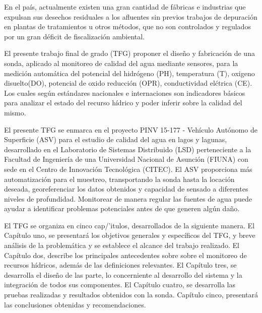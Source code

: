 En el pa\'is, actualmente existen una gran cantidad de f\'abricas e industrias que expulsan sus desechos residuales a los afluentes sin previos trabajos de depuraci\'on en plantas de tratamientos u otros m\'etodos, que no son controlados y regulados por un gran d\'eficit de fiscalizaci\'on ambiental. 


%
%
%

El presente trabajo final de grado (TFG) proponer el dise\~no y fabricación de una sonda, aplicado al monitoreo de calidad del agua mediante sensores, para la medici\'on autom\'atica del potencial del hidr\'ogeno (PH), temperatura (T), oxigeno disuelto(DO), potencial de oxido reducci\'on (OPR), conductividad el\'ctrica (CE). Los cuales seg\'un est\'andares nacionales e internaciones son indicadores b\'asicos para analizar el estado del recurso h\'idrico y poder inferir sobre la calidad del mismo.  


El presente TFG se enmarca en el proyecto PINV 15-177 - Veh\'iculo Aut\'onomo de Superficie (ASV) para el estudio de calidad del agua en lagos y lagunas, desarrollado en el Laboratorio de Sistemas Distribuido (LSD) perteneciente a la Facultad de Ingenier\'ia de una Universidad Nacional de Asunci\'on (FIUNA) con sede en el Centro de Innovaci\'on Tecnol\'ogica (CITEC). El ASV proporciona m\'as automatizaci\'on para el muestreo, transportando la sonda hasta la locaci\'on deseada, georeferenciar los datos obtenidos y capacidad de sensado a diferentes niveles de profundidad. Monitorear de manera regular las fuentes de agua puede ayudar a identificar problemas potenciales antes de que generen algún daño.

El TFG  se organiza en cinco cap/'itulos, desarrollados de la siguiente manera. 
El Capítulo uno, se presentar\'a los objetivos generales y espec\'ificos del TFG,  y breve an\'alisis de la problem\'atica y se establece el alcance del trabajo realizado.
El Capítulo dos, describe los principales antecedentes sobre sobre el monitoreo de recursos h\'idricos, adem\'as de las definiciones relevantes.
El Capítulo tres, se desarrolla el dise\~no de las parte, lo concerniente al desarrollo del sistema y la integraci\'on de todos sus componentes.   
El Capítulo cuatro, se desarrolla las pruebas realizadas y resultados obtenidos con la sonda. 
Capítulo cinco,  presentar\'a las conclusiones obtenidas y recomendaciones.

